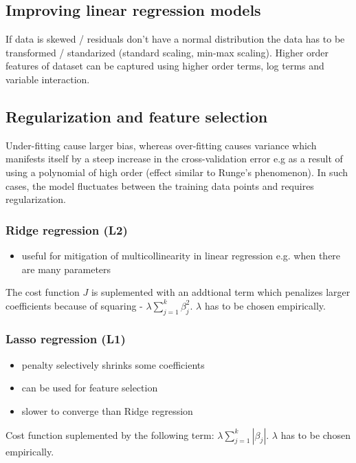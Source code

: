 \documentclass[11pt]{book}
\begin{document}
\subsection{Improving linear regression models}

If data is skewed / residuals don't have a normal distribution the data has to be transformed / standarized (standard scaling, min-max scaling). Higher order features of dataset can be captured using higher order terms, log terms and variable interaction.

\subsection{Regularization and feature selection}

Under-fitting cause larger bias, whereas over-fitting causes variance which manifests itself by a steep increase in the cross-validation error e.g as a result of using a polynomial of high order (effect similar to Runge's phenomenon). In such cases, the model fluctuates between the training data points and requires regularization.

\subsubsection{Ridge regression (L2)}
\begin{itemize}
    \item useful for mitigation of multicollinearity in linear regression e.g. when there are many parameters 
\end{itemize}

The cost function $J$ is suplemented with an addtional term which penalizes larger coefficients because of squaring - $\lambda \sum_{j=1}^{k} \beta_j^2$. $\lambda$ has to be chosen empirically.

\subsubsection{Lasso regression (L1)}
\begin{itemize}
    \item penalty selectively shrinks some coefficients
    \item can be used for feature selection
    \item slower to converge than Ridge regression
\end{itemize}

Cost function suplemented by the following term: $\lambda \sum_{j=1}^{k} |\beta_j|$. $\lambda$ has to be chosen empirically. 
\end{document}
